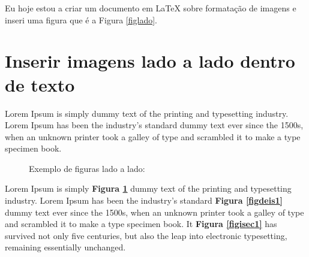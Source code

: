 \documentclass[12pt,a4paper,twoside]{article}
\begin{document}
Eu hoje estou a criar um documento em LaTeX sobre formatação de imagens e inseri uma figura que é a Figura \ref{figlado}.\\

\section{Inserir imagens lado a lado dentro de texto}

Lorem Ipsum is simply dummy text of the printing and typesetting industry. Lorem Ipsum has been the industry's standard dummy text ever since the 1500s, when an unknown printer took a galley of type and scrambled it to make a type specimen book.

\begin{figure}[!htb]
    \centering
    \caption{Exemplo de figuras lado a lado:}
    \label{figladoalado}
    \hfill %
\end{figure}

Lorem Ipsum is simply \textbf{Figura \ref{figladoalado}} dummy text of the printing and typesetting industry. Lorem Ipsum has been the industry's standard \textbf{Figura \ref{figdeis1}} dummy text ever since the 1500s, when an unknown printer took a galley of type and scrambled it to make a type specimen book. It \textbf{Figura \ref{figisec1}} has survived not only five centuries, but also the leap into electronic typesetting, remaining essentially unchanged.
\end{document}
